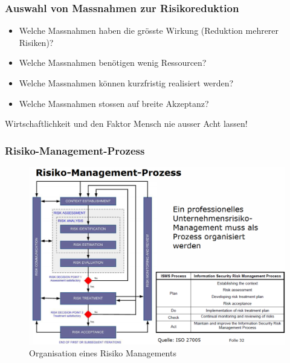 \documentclass[10pt,a4paper]{article}
\begin{document}
\subsubsection*{Auswahl von Massnahmen zur Risikoreduktion}
\begin{itemize}[noitemsep,topsep=0pt,leftmargin=*]
    \item Welche Massnahmen haben die grösste Wirkung
    (Reduktion mehrerer Risiken)?
    \item Welche Massnahmen benötigen wenig Ressourcen?
    \item Welche Massnahmen können kurzfristig realisiert
    werden?
    \item Welche Massnahmen stossen auf breite Akzeptanz?
\end{itemize}
\noindent
Wirtschaftlichkeit und den Faktor Mensch nie ausser Acht lassen!

\subsubsection*{Risiko-Management-Prozess}
\begin{figure}[H]
    \begin{center}
    \includegraphics[width=14cm]{images/Risiko_Management_Prozess.png}
    \caption{Organisation eines Risiko Managements}
    \label{Risiko Management Prozess}
    \end{center}
\end{figure}
\end{document}

